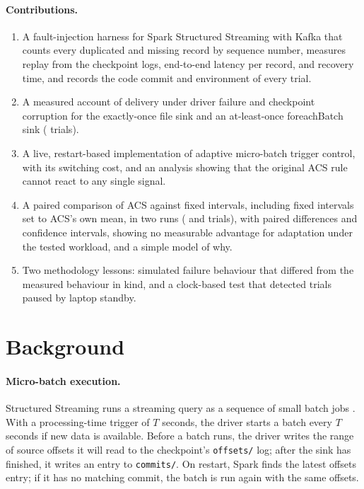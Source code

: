 \documentclass[10pt,twocolumn]{article}
\begin{document}
\paragraph{Contributions.}
\begin{enumerate}
\item A fault-injection harness for Spark Structured Streaming with Kafka that
counts every duplicated and missing record by sequence number, measures replay
from the checkpoint logs, end-to-end latency per record, and recovery time, and
records the code commit and environment of every trial.
\item A measured account of delivery under driver failure and checkpoint
corruption for the exactly-once file sink and an at-least-once foreachBatch
sink (\SOneTrials{} trials).
\item A live, restart-based implementation of adaptive micro-batch trigger
control, with its switching cost, and an analysis showing that the original ACS
rule cannot react to any single signal.
\item A paired comparison of ACS against fixed intervals, including fixed
intervals set to ACS's own mean, in two runs (\ACSTrialsOne{} and
\ACSTrialsTwo{} trials), with paired differences and confidence intervals,
showing no measurable advantage for adaptation under the tested workload, and a
simple model of why.
\item Two methodology lessons: simulated failure behaviour that differed from
the measured behaviour in kind, and a clock-based test that detected trials
paused by laptop standby.
\end{enumerate}

\section{Background}

\paragraph{Micro-batch execution.}
Structured Streaming runs a streaming query as a sequence of small batch jobs
\cite{armbrust2018structured,zaharia2013discretized}. With a processing-time
trigger of $T$ seconds, the driver starts a batch every $T$ seconds if new data
is available. Before a batch runs, the driver writes the range of source
offsets it will read to the checkpoint's \texttt{offsets/} log; after the sink
has finished, it writes an entry to \texttt{commits/}. On restart, Spark finds
the latest offsets entry; if it has no matching commit, the batch is run again
with the same offsets.
\end{document}
